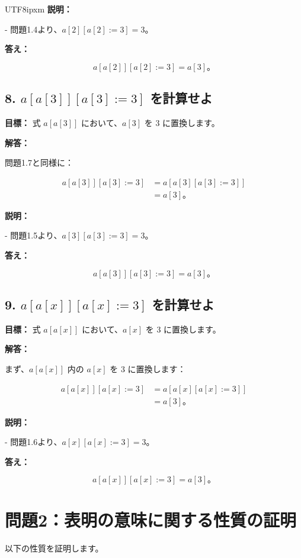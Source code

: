 \documentclass[12pt,a4paper]{article}
\begin{document}
\begin{CJK}{UTF8}{ipxm}
\textbf{説明：}

- 問題1.4より、\( a[2][a[2] := 3] = 3 \)。

\textbf{答え：}

\[
a[a[2]][a[2] := 3] = a[3]。
\]

\subsection*{8. \( a[a[3]][a[3] := 3] \) を計算せよ}

\textbf{目標：} 式 \( a[a[3]] \) において、\( a[3] \) を \( 3 \) に置換します。

\textbf{解答：}

問題1.7と同様に：

\[
\begin{aligned}
a[a[3]][a[3] := 3] &= a[a[3][a[3] := 3]] \\
&= a[3]。
\end{aligned}
\]

\textbf{説明：}

- 問題1.5より、\( a[3][a[3] := 3] = 3 \)。

\textbf{答え：}

\[
a[a[3]][a[3] := 3] = a[3]。
\]

\subsection*{9. \( a[a[x]][a[x] := 3] \) を計算せよ}

\textbf{目標：} 式 \( a[a[x]] \) において、\( a[x] \) を \( 3 \) に置換します。

\textbf{解答：}

まず、\( a[a[x]] \) 内の \( a[x] \) を \( 3 \) に置換します：

\[
\begin{aligned}
a[a[x]][a[x] := 3] &= a[a[x][a[x] := 3]] \\
&= a[3]。
\end{aligned}
\]

\textbf{説明：}

- 問題1.6より、\( a[x][a[x] := 3] = 3 \)。

\textbf{答え：}

\[
a[a[x]][a[x] := 3] = a[3]。
\]

\section*{問題2：表明の意味に関する性質の証明}

以下の性質を証明します。


\end{CJK}
\end{document}
